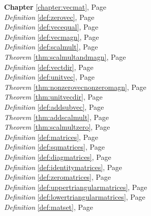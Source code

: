 \begin{multicols}{3}
   \begin{center}
      \textbf{Chapter} \ref{chapter:vecmat}, Page \pageref{chapter:vecmat} \\
      \textit{Definition} \ref{def:zerovec}, Page \pageref{def:zerovec} \\
      \textit{Definition} \ref{def:vecequal}, Page \pageref{def:vecequal} \\
      \textit{Definition} \ref{def:vecmagn}, Page \pageref{def:vecmagn} \\
      \textit{Definition} \ref{def:scalmult}, Page \pageref{def:scalmult} \\
      \textit{Theorem} \ref{thm:scalmultandmagn}, Page \pageref{thm:scalmultandmagn} \\
      \textit{Definition} \ref{def:vectdir}, Page \pageref{def:vectdir} \\
      \textit{Definition} \ref{def:unitvec}, Page \pageref{def:unitvec} \\
      \textit{Theorem} \ref{thm:nonzerovecnonzeromagn}, Page \pageref{thm:nonzerovecnonzeromagn} \\
      \textit{Theorem} \ref{thm:unitvecdir}, Page \pageref{thm:unitvecdir} \\
      \textit{Definition} \ref{def:addsubvec}, Page \pageref{def:addsubvec} \\
      \textit{Theorem} \ref{thm:addscalmult}, Page \pageref{thm:addscalmult} \\
      \textit{Theorem} \ref{thm:scalmultzero}, Page \pageref{thm:scalmultzero} \\
      \textit{Definition} \ref{def:matrices}, Page \pageref{def:matrices} \\
      \textit{Definition} \ref{def:sqmatrices}, Page \pageref{def:sqmatrices} \\
      \textit{Definition} \ref{def:diagmatrices}, Page \pageref{def:diagmatrices} \\
      \textit{Definition} \ref{def:identitymatrices}, Page \pageref{def:identitymatrices} \\
      \textit{Definition} \ref{def:zeromatrices}, Page \pageref{def:zeromatrices} \\
      \textit{Definition} \ref{def:uppertriangularmatrices}, Page \pageref{def:uppertriangularmatrices} \\
      \textit{Definition} \ref{def:lowertriangularmatrices}, Page \pageref{def:lowertriangularmatrices} \\
      \textit{Definition} \ref{def:matset}, Page \pageref{def:matset} \\

\end{center}
\end{multicols}
